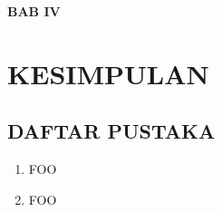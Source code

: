 \documentclass[12pt, a4paper]{article}
\begin{document}
  \newpage


  \begin{center}
    \large{\textbf{BAB IV}}
    \section*{KESIMPULAN}
  \end{center}
  \setcounter{section}{4}
  \setcounter{subsection}{0}
  \vspace{1cm}

  \newpage


  \begin{center}
    \section*{DAFTAR PUSTAKA}
  \end{center}
  \vspace{1cm}

  \begin{enumerate}
    \item FOO
    \item FOO
  \end{enumerate}

\end{document}
